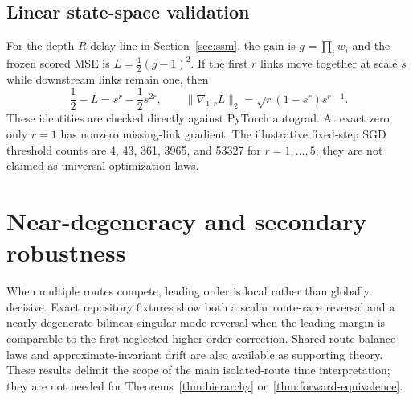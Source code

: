 \subsection{Linear state-space validation}
For the depth-$R$ delay line in Section~\ref{sec:ssm}, the gain is $g=\prod_iw_i$ and the frozen scored MSE is $L=\tfrac12(g-1)^2$. If the first $r$ links move together at scale $s$ while downstream links remain one, then
\[
\frac12-L=s^r-\frac12s^{2r},\qquad
\|\nabla_{1:r}L\|_2=\sqrt r(1-s^r)s^{r-1}.
\]
These identities are checked directly against PyTorch autograd. At exact zero, only $r=1$ has nonzero missing-link gradient. The illustrative fixed-step SGD threshold counts are 4, 43, 361, 3965, and 53327 for $r=1,\ldots,5$; they are not claimed as universal optimization laws.

\section{Near-degeneracy and secondary robustness}
When multiple routes compete, leading order is local rather than globally decisive. Exact repository fixtures show both a scalar route-race reversal and a nearly degenerate bilinear singular-mode reversal when the leading margin is comparable to the first neglected higher-order correction. Shared-route balance laws and approximate-invariant drift are also available as supporting theory. These results delimit the scope of the main isolated-route time interpretation; they are not needed for Theorems~\ref{thm:hierarchy} or~\ref{thm:forward-equivalence}.
